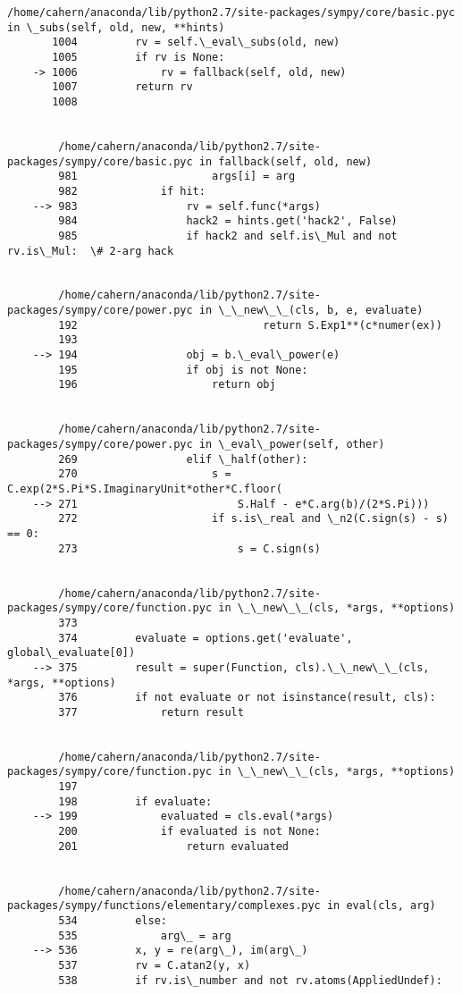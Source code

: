 \begin{Verbatim}[commandchars=\\\{\}]
        /home/cahern/anaconda/lib/python2.7/site-packages/sympy/core/basic.pyc in \_subs(self, old, new, **hints)
       1004         rv = self.\_eval\_subs(old, new)
       1005         if rv is None:
    -> 1006             rv = fallback(self, old, new)
       1007         return rv
       1008 


        /home/cahern/anaconda/lib/python2.7/site-packages/sympy/core/basic.pyc in fallback(self, old, new)
        981                     args[i] = arg
        982             if hit:
    --> 983                 rv = self.func(*args)
        984                 hack2 = hints.get('hack2', False)
        985                 if hack2 and self.is\_Mul and not rv.is\_Mul:  \# 2-arg hack


        /home/cahern/anaconda/lib/python2.7/site-packages/sympy/core/power.pyc in \_\_new\_\_(cls, b, e, evaluate)
        192                             return S.Exp1**(c*numer(ex))
        193 
    --> 194                 obj = b.\_eval\_power(e)
        195                 if obj is not None:
        196                     return obj


        /home/cahern/anaconda/lib/python2.7/site-packages/sympy/core/power.pyc in \_eval\_power(self, other)
        269                 elif \_half(other):
        270                     s = C.exp(2*S.Pi*S.ImaginaryUnit*other*C.floor(
    --> 271                         S.Half - e*C.arg(b)/(2*S.Pi)))
        272                     if s.is\_real and \_n2(C.sign(s) - s) == 0:
        273                         s = C.sign(s)


        /home/cahern/anaconda/lib/python2.7/site-packages/sympy/core/function.pyc in \_\_new\_\_(cls, *args, **options)
        373 
        374         evaluate = options.get('evaluate', global\_evaluate[0])
    --> 375         result = super(Function, cls).\_\_new\_\_(cls, *args, **options)
        376         if not evaluate or not isinstance(result, cls):
        377             return result


        /home/cahern/anaconda/lib/python2.7/site-packages/sympy/core/function.pyc in \_\_new\_\_(cls, *args, **options)
        197 
        198         if evaluate:
    --> 199             evaluated = cls.eval(*args)
        200             if evaluated is not None:
        201                 return evaluated


        /home/cahern/anaconda/lib/python2.7/site-packages/sympy/functions/elementary/complexes.pyc in eval(cls, arg)
        534         else:
        535             arg\_ = arg
    --> 536         x, y = re(arg\_), im(arg\_)
        537         rv = C.atan2(y, x)
        538         if rv.is\_number and not rv.atoms(AppliedUndef):



\end{Verbatim}
